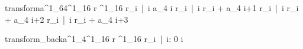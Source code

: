 \documentclass[12pt,a4paper]{book}
\begin{document}
\begin{eqcode}{transform}{a}{^1_{64}}{^1_{16}}
    r \in {}^1_{16} \lend
    r_i\  |\  \forall i \gets a_{4 \cdot i}  \lend
    r_i\  |\  \forall i \gets r_i + a_{4 \cdot i+1}  \lend
    r_i\  |\  \forall i \gets r_i + a_{4 \cdot i+2}  \lend
    r_i\  |\  \forall i  \gets r_i + a_{4 \cdot i+3} \lend
     \lend
\end{eqcode}

\begin{eqcode}{transform\_back}{a}{^1_4}{^1_{16}}
    r \in {}^1_{16} \lend
    r_i\  |\  i: 0 \leq i  \gets {} \lend
     \lend
\end{eqcode}
%
\end{document}
